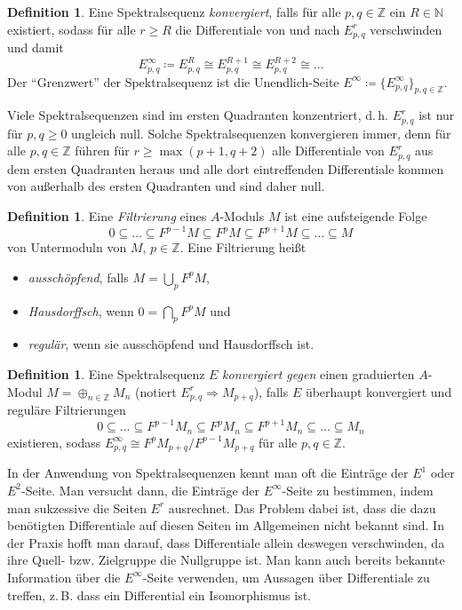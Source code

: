 \documentclass[11pt, a4paper, german]{article}
\theoremstyle{definition}
\newtheorem{defn}[lem]{Definition}
\theoremstyle{remark}
\newcommand{\N}{\mathbb{N}} %
\newcommand{\Z}{\mathbb{Z}} %
\renewcommand{\dh}{d.\,h.} %
\begin{document}
\begin{defn}
  Eine Spektralsequenz \emph{konvergiert}, falls für alle $p, q \in \Z$ ein $R \in \N$ existiert, sodass für alle $r \geq R$ die Differentiale von und nach $E^r_{p,q}$ verschwinden und damit
  \[ E^\infty_{p,q} \coloneqq E^R_{p,q} \cong E^{R+1}_{p,q} \cong E^{R+2}_{p,q} \cong \ldots \]
  Der "`Grenzwert"' der Spektralsequenz ist die Unendlich-Seite $E^\infty \coloneqq \{ E^\infty_{p,q} \}_{p,q \in \Z}$.
\end{defn}

Viele Spektralsequenzen sind im ersten Quadranten konzentriert, \dh{} $E^r_{p,q}$ ist nur für $p, q \geq 0$ ungleich null.
Solche Spektralsequenzen konvergieren immer, denn für alle $p, q \in \Z$ führen für $r \geq \max(p+1, q+2)$ alle Differentiale von $E^r_{p,q}$ aus dem ersten Quadranten heraus und alle dort eintreffenden Differentiale kommen von außerhalb des ersten Quadranten und sind daher null.

\begin{defn}
  Eine \emph{Filtrierung} eines $A$-Moduls $M$ ist eine aufsteigende Folge
  \[ 0 \subseteq \ldots \subseteq F^{p-1} M \subseteq F^p M \subseteq F^{p+1} M \subseteq \ldots \subseteq M \]
  von Untermoduln von $M$, $p \!\in\! \Z$.
  Eine Filtrierung heißt
  \begin{itemize}
    \item \emph{ausschöpfend}, falls $M = \bigcup_p F^p M$,
    \item \emph{Hausdorffsch}, wenn $0 = \bigcap_p F^p M$ und
    \item \emph{regulär}, wenn sie ausschöpfend und Hausdorffsch ist.
  \end{itemize}
\end{defn}

\begin{defn}
  Eine Spektralsequenz $E$ \emph{konvergiert gegen} einen graduierten $A$-Modul $M = \oplus_{n \in \Z} M_n$ (notiert $E^r_{p,q} \Rightarrow M_{p+q}$), falls $E$ überhaupt konvergiert und reguläre Filtrierungen
  \[ 0 \subseteq \ldots \subseteq F^{p-1} M_n \subseteq F^p M_n \subseteq F^{p+1} M_n \subseteq \ldots \subseteq M_n \]
  existieren, sodass $E^\infty_{p,q} \cong F^p M_{p+q} / F^{p-1} M_{p+q}$ für alle $p, q \in \Z$.
\end{defn}

In der Anwendung von Spektralsequenzen kennt man oft die Einträge der $E^1$ oder $E^2$-Seite.
Man versucht dann, die Einträge der $E^\infty$-Seite zu bestimmen, indem man sukzessive die Seiten $E^r$ ausrechnet.
Das Problem dabei ist, dass die dazu benötigten Differentiale auf diesen Seiten im Allgemeinen nicht bekannt sind.
In der Praxis hofft man darauf, dass Differentiale allein deswegen verschwinden, da ihre Quell- bzw. Zielgruppe die Nullgruppe ist.
Man kann auch bereits bekannte Information über die $E^\infty$-Seite verwenden, um Aussagen über Differentiale zu treffen, z.\,B. dass ein Differential ein Isomorphismus ist.
\end{document}
